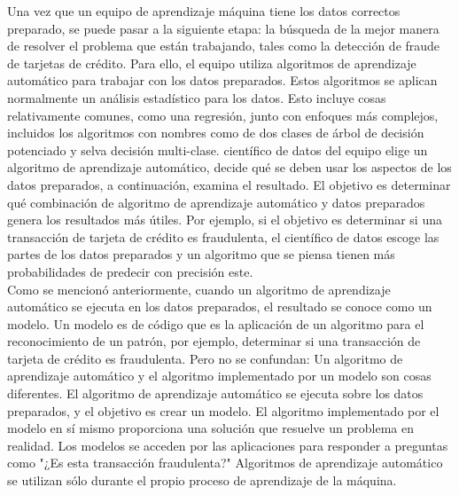\documentclass[11pt]{article}
\begin{document}
Una vez que un equipo de aprendizaje máquina tiene los datos correctos preparado, se puede pasar a la siguiente etapa: la búsqueda de la mejor manera de resolver el problema que están trabajando, tales como la detección de fraude de tarjetas de crédito. Para ello, el equipo utiliza algoritmos de aprendizaje automático para trabajar con los datos preparados. Estos algoritmos se aplican normalmente un análisis estadístico para los datos. Esto incluye cosas relativamente comunes, como una regresión, junto con enfoques más complejos, incluidos los algoritmos con nombres como de dos clases de árbol de decisión potenciado y selva decisión multi-clase. científico de datos del equipo elige un algoritmo de aprendizaje automático, decide qué se deben usar los aspectos de los datos preparados, a continuación, examina el resultado. El objetivo es determinar qué combinación de algoritmo de aprendizaje automático y datos preparados genera los resultados más útiles. Por ejemplo, si el objetivo es determinar si una transacción de tarjeta de crédito es fraudulenta, el científico de datos escoge las partes de los datos preparados y un algoritmo que se piensa tienen más probabilidades de predecir con precisión este.\\

Como se mencionó anteriormente, cuando un algoritmo de aprendizaje automático se ejecuta en los datos preparados, el resultado se conoce como un modelo. Un modelo es de código que es la aplicación de un algoritmo para el reconocimiento de un patrón, por ejemplo, determinar si una transacción de tarjeta de crédito es fraudulenta. Pero no se confundan: Un algoritmo de aprendizaje automático y el algoritmo implementado por un modelo son cosas diferentes. El algoritmo de aprendizaje automático se ejecuta sobre los datos preparados, y el objetivo es crear un modelo. El algoritmo implementado por el modelo en sí mismo proporciona una solución que resuelve un problema en realidad. Los modelos se acceden por las aplicaciones para responder a preguntas como "¿Es esta transacción fraudulenta?" Algoritmos de aprendizaje automático se utilizan sólo durante el propio proceso de aprendizaje de la máquina.\\
\end{document}
